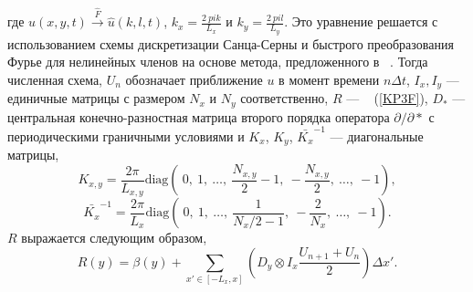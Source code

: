 где $u (x, y, t) \xrightarrow {\hat{F}} \hat{u} (k, l, t)$, $k_x = \frac{2 \ pi k}{L_x}$ и $ k_y = \frac{2 \ pi l}{L_y}$. Это уравнение решается с использованием схемы дискретизации Санца-Серны и быстрого преобразования Фурье для нелинейных членов на основе метода, предложенного в ~\cite {Chebab2016}. Тогда численная схема,
$ U_n $ обозначает приближение $ u $ в момент времени $ n \Delta t $, $ I_x, I_y $ --- единичные матрицы с размером $ N_x $ и $ N_y $ соответственно, $ R $ ---  ~ (\ref{KP3F}), $ D_* $ --- центральная конечно-разностная матрица второго порядка оператора $ \partial / \partial *$ с периодическими граничными условиями и $ K_x $, $ K_y $, $ \bar {K_x}^{-1} $ --- диагональные матрицы,
$$
K_{x,y} = \frac{2 \pi}{L_{x,y}} \text{diag} \left( ~0, ~1, ~\dots, ~\frac{N_{x,y}}{2}-1, ~-\frac{N_{x,y}}{2}, ~\dots, ~-1 \right),
$$
$$
\bar{K_x}^{-1}= \frac{2 \pi}{L_x} \text{diag} \left( ~0, ~1, ~\dots, ~\frac{1}{N_{x}/2-1}, ~-\frac{2}{N_x}, ~\dots, ~-1 \right).
$$
$R$ выражается следующим образом,
\begin{equation}
	R(y) = \beta(y) + \sum_{x' \in \left[ -L_x, x\right]} \left(D_y \otimes I_x \frac{U_{n+1} + U_{n}}{2}\right) \Delta x'.
	\label{termRY}
\end{equation}

